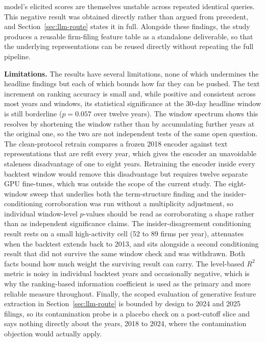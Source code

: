 \documentclass[logo,msc,ai]{infthesis}        %
\begin{document}
model's elicited scores are themselves unstable across repeated identical queries. This negative result was obtained directly rather than argued from precedent, and Section~\ref{sec:llm-route} states it in full. Alongside these findings, the study produces a reusable firm-filing feature table as a standalone deliverable, so that the underlying representations can be reused directly without repeating the full pipeline.

\textbf{Limitations.} The results have several limitations, none of which undermines the headline findings but each of which bounds how far they can be pushed. The text increment on ranking accuracy is small and, while positive and consistent across most years and windows, its statistical significance at the 30-day headline window is still borderline ($p=0.057$ over twelve years). The window spectrum shows this resolves by shortening the window rather than by accumulating further years at the original one, so the two are not independent tests of the same open question. The clean-protocol retrain compares a frozen 2018 encoder against text representations that are refit every year, which gives the encoder an unavoidable staleness disadvantage of one to eight years. Retraining the encoder inside every backtest window would remove this disadvantage but requires twelve separate GPU fine-tunes, which was outside the scope of the current study. The eight-window sweep that underlies both the term-structure finding and the insider-conditioning corroboration was run without a multiplicity adjustment, so individual window-level $p$-values should be read as corroborating a shape rather than as independent significance claims. The insider-disagreement conditioning result rests on a small high-activity cell (52 to 89 firms per year), attenuates when the backtest extends back to 2013, and sits alongside a second conditioning result that did not survive the same window check and was withdrawn. Both facts bound how much weight the surviving result can carry. The level-based $R^2$ metric is noisy in individual backtest years and occasionally negative, which is why the ranking-based information coefficient is used as the primary and more reliable measure throughout. Finally, the scoped evaluation of generative feature extraction in Section~\ref{sec:llm-route} is bounded by design to 2024 and 2025 filings, so its contamination probe is a placebo check on a post-cutoff slice and says nothing directly about the years, 2018 to 2024, where the contamination objection would actually apply.
\end{document}
